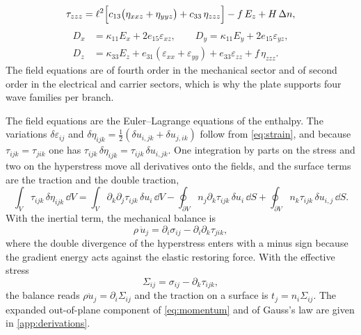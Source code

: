 \begin{equation}
\label{eq:tauZnO}
\tau_{zzz}=\ell^{2}\Bigl[c_{13}\bigl(\eta_{xxz}+\eta_{yyz}\bigr)
+c_{33}\,\eta_{zzz}\Bigr]-f\,E_z+H\,\Delta n ,
\end{equation}
\begin{equation}
\label{eq:DZnO}
\begin{aligned}
D_x&=\kappa_{11}E_x+2e_{15}\varepsilon_{xz},\qquad
D_y=\kappa_{11}E_y+2e_{15}\varepsilon_{yz},\\
D_z&=\kappa_{33}E_z+e_{31}(\varepsilon_{xx}+\varepsilon_{yy})
+e_{33}\varepsilon_{zz}+f\,\eta_{zzz}.
\end{aligned}
\end{equation}
The field equations are of fourth order in the mechanical sector and of second order in the electrical and carrier sectors, which is why the plate supports four wave families per branch.

The field equations are the Euler--Lagrange equations of the enthalpy.  The variations $\delta\varepsilon_{ij}$ and $\delta\eta_{ijk}=\tfrac12(\delta u_{i,jk}+\delta u_{j,ik})$ follow from \eqref{eq:strain}, and because $\tau_{ijk}=\tau_{jik}$ one has $\tau_{ijk}\,\delta\eta_{ijk}=\tau_{ijk}\,\delta u_{i,jk}$.  One integration by parts on the stress and two on the hyperstress move all derivatives onto the fields, and the surface terms are the traction and the double traction,
\begin{equation}
\label{eq:ibp_hyper}
\int_V\tau_{ijk}\,\delta\eta_{ijk}\,\dd V
=\int_V\partial_k\partial_j\tau_{ijk}\,\delta u_i\,\dd V
-\oint_{\partial V}n_j\partial_k\tau_{ijk}\,\delta u_i\,\dd S
+\oint_{\partial V}n_k\tau_{ijk}\,\delta u_{i,j}\,\dd S .
\end{equation}
With the inertial term, the mechanical balance is
\begin{equation}
\label{eq:momentum}
\rho\,\ddot u_j=\partial_i\sigma_{ij}-\partial_i\partial_k\tau_{jik},
\end{equation}
where the double divergence of the hyperstress enters with a minus sign because the gradient energy acts against the elastic restoring force.  With the effective stress
\begin{equation}
\label{eq:effective}
\Sigma_{ij}=\sigma_{ij}-\partial_k\tau_{ijk},
\end{equation}
the balance reads $\rho\ddot u_j=\partial_i\Sigma_{ij}$ and the traction on a surface is $t_j=n_i\Sigma_{ij}$.  The expanded out-of-plane component of \eqref{eq:momentum} and of Gauss's law are given in \cref{app:derivations}.

